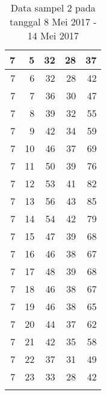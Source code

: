 \begin{longtable}{|r|r|r|r|r|}
    7     & 5     & 32    & 28    & 37 \\\hline
    7     & 6     & 32    & 28    & 42 \\\hline
    7     & 7     & 36    & 30    & 47 \\\hline
    7     & 8     & 39    & 32    & 55 \\\hline
    7     & 9     & 42    & 34    & 59 \\\hline
    7     & 10    & 46    & 37    & 69 \\\hline
    7     & 11    & 50    & 39    & 76 \\\hline
    7     & 12    & 53    & 41    & 82 \\\hline
    7     & 13    & 56    & 43    & 85 \\\hline
    7     & 14    & 54    & 42    & 79 \\\hline
    7     & 15    & 47    & 39    & 68 \\\hline
    7     & 16    & 46    & 38    & 67 \\\hline
    7     & 17    & 48    & 39    & 68 \\\hline
    7     & 18    & 46    & 38    & 67 \\\hline
    7     & 19    & 46    & 38    & 65 \\\hline
    7     & 20    & 44    & 37    & 62 \\\hline
    7     & 21    & 42    & 35    & 58 \\\hline
    7     & 22    & 37    & 31    & 49 \\\hline
    7     & 23    & 33    & 28    & 42 \\\hline
  \caption{Data sampel 2 pada tanggal 8 Mei 2017 - 14 Mei 2017}
  \label{tab:datasample28052017}%
\end{longtable}%
